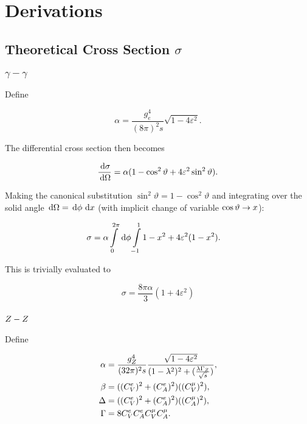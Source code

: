 \documentclass[]{report}
\begin{document}
\tableofcontents

\chapter{Derivations}

\section{Theoretical Cross Section $\sigma$}

\subsection{$\gamma-\gamma$}

Define

$$
\alpha = \frac{g_{e}^{4}}{(8\pi)^{2}s} \sqrt{1-4\varepsilon^{2}}.
$$

The differential cross section then becomes

$$
\frac{\,\operatorname{d}\!{\sigma}}{\,\operatorname{d}\!{\Omega}} = \alpha (1 - \cos^{2}{\vartheta} + 4\varepsilon^{2}\sin^{2}{\vartheta}).
$$

Making the canonical substitution $\sin^{2}{\vartheta} = 1 - \cos^{2}{\vartheta}$ and integrating over the solid angle $\,\operatorname{d}\!{\Omega} = \,\operatorname{d}\!{\phi}\,\operatorname{d}\!{x}$ (with implicit change of variable $\cos{\vartheta}\rightarrow x$):

\begin{align*}
\sigma &= \alpha \int\limits_{0}^{2\pi}\d{\phi} \int\limits_{-1}^{1} 1 - x^{2} + 4\varepsilon^{2}(1 - x^{2}).
\end{align*}

This is trivially evaluated to

$$
\sigma = \frac{8\pi\alpha}{3}(1+4\varepsilon^{2})
$$

\subsection{$Z -Z $}

Define

\begin{align*}
\alpha &= \frac{g_{\Zzero}^{4}}{(32\pi)^{2}s} \frac{\sqrt{1-4\varepsilon^{2}}}{(1-\lambda^{2})^{2} + (\frac{\lambda\Gamma_{\Zzero}}{\rts})},
\\
\beta &= ((C_{V}^{e})^{2} + (C_{A}^{e})^{2})((C_{V}^{\mu})^{2}),
\\
\Delta &= ((C_{V}^{e})^{2} + (C_{A}^{e})^{2})((C_{A}^{\mu})^{2}),
\\
\Gamma &= 8C_{V}^{e}C_{A}^{e}C_{V}^{\mu}C_{A}^{\mu}.
\end	{align*}
\end{document}
